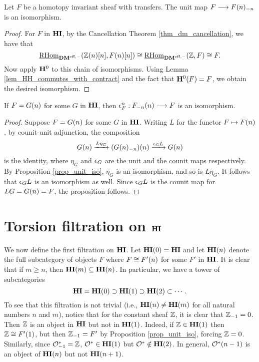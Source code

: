 \begin{prop}\label{prop_unit_iso}
Let $F$ be a homotopy invariant sheaf with transfers. The unit map 
$F \to \RHI[n]{\LHI[n]{F}}$ is an isomorphism.
\end{prop}
\begin{proof}
For $F$ in $\HI$, by the Cancellation Theorem 
\ref{thm_dm_cancellation}, we have that 
\[
\ihomDMf(\Z(n)[n], F(n)[n]) \cong \ihomDMf(\Z, F) 
\cong F. 
\]
Now apply $\HH^0$ to this chain of isomorphisms. Using Lemma
\ref{lem_HH_commutes_with_contract} and the fact that $\HH^0(F) = 
F$, we obtain the desired isomorphism.
\end{proof}

\begin{prop}\label{prop_counit_iso_for_HIn}
If $F = \LHI[n]{G}$ for some $G$ in $\HI$, then $\cuHI^n_F : 
\LHI[n]{\RHI[n]{F}} \to F$ is an isomorphism.
\end{prop}
\begin{proof}
Suppose $F = \LHI[n]{G}$ for some $G$ in $\HI$. Writing $L$ for 
the functor 
$F \mapsto \LHI[n]F$, by counit-unit adjunction, the composition
\[
\LHI[n]{G} \xrightarrow{L\eta_G} \LHI[n]{(\RHI[n]{\LHI[n]{G}})}
   \xrightarrow{\cuHI_G L} \LHI[n]{G}
\]
is the identity, where $\eta_{G}$ and $\cuHI_{G}$ are the unit and 
the counit maps respectively. By Proposition \ref{prop_unit_iso}, 
$\eta_{G}$ is an isomorphism, and so is $L\eta_{G}$. It follows
that $\cuHI_G L$ is an isomorphism as well. Since $\cuHI_G L$ is the 
counit map for $LG = \LHI[n]{G} = F$, the proposition follows.
\end{proof}

\section{Torsion filtration on $\HI$}
\label{sect_torsion_filt_on_HI}

We now define the first filtration on $\HI$. Let $\LHI[0]{\HI} = 
\HI$ and let $\LHI[n]{\HI}$ denote the full subcategory of objects 
$F$ where $F \cong \LHI[n]{F'}$ for some $F'$ in $\HI$. It is clear 
that if $m \geq n$, then $\LHI[m]{\HI} \subseteq \LHI[n]{\HI}$. 
In particular, we have a tower of subcategories
\[
\HI = \LHI[0]{\HI} \supset \LHI[1]{\HI} \supset \LHI[2]{\HI} 
\subset \cdots.
\]
To see that this filtration is not trivial (i.e., $\LHI[n]{\HI} \neq
\LHI[m]{\HI}$ for all natural numbers $n$ and $m$), notice that
for the constant sheaf $\Z$, it is clear that $\RHI{\Z} = 0$. 
Then $\Z$ is an object in $\HI$ but not in $\LHI{\HI}$. Indeed, if 
$\Z \in \LHI{\HI}$ then $\Z \cong \LHI{F'}$, but then $\RHI{\Z} = F'$ 
by Proposition \ref{prop_unit_iso}, forcing $\Z = 0$. Similarly, 
since $\RHI{\Ox} = \Z$, $\Ox \in \LHI{\HI}$ but $\Ox \notin
\LHI[2]{\HI}$. In general, $\LHI[n - 1]{\Ox}$ is an object of
$\LHI[n]{\HI}$ but not $\LHI[n + 1]{\HI}$.


